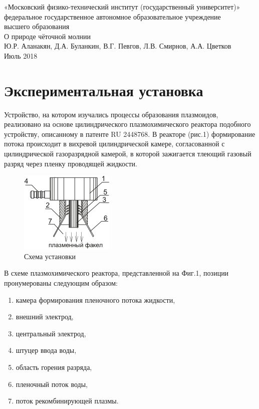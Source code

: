 \documentclass[a4paper]{article}
\begin{document}
\begin{center}
\large{«Московский физико-технический институт (государственный университет)»}\\
\footnotesize{федеральное государственное автономное образовательное учреждение}\\ 
\footnotesize{высшего образования}\\
 \hfill \break
\hfill\break
\hfill \break
\hfill \break
\hfill \break
\large{О природе чёточной молнии}\\
\hfill \break
\hfill \break
\hfill \break
\hfill \break
\large{Ю.Р. Аланакян, Д.А. Буланкин, В.Г. Певгов, Л.В. Смирнов, А.А. Цветков}\\
\hfill \break
\hfill \break
\hfill \break
\hfill \break
\hfill \break
\normalsize{Июль 2018} 
\end{center}

\newpage

\section{Экспериментальная установка}
Устройство, на котором изучались процессы образования плазмоидов, реализовано на основе цилиндрического плазмохимического реактора подобного устройству, описанному в патенте RU 2448768. В реакторе (рис.1) формирование потока происходит в вихревой цилиндрической камере, согласованной с цилиндрической газоразрядной камерой, в которой зажигается тлеющий газовый разряд через пленку проводящей жидкости.
\begin{figure}[h]
    \includegraphics{ShemaUstanovki.png}
    \centering
    \caption{Схема установки}
\end{figure}

В схеме плазмохимического реактора, представленной на Фиг.1, позиции пронумерованы следующим образом:
\begin{enumerate}
    \item камера формирования пленочного потока жидкости,
    \item внешний электрод,
    \item центральный электрод,
    \item штуцер ввода воды,
    \item область горения разряда,
    \item пленочный поток воды,
    \item поток рекомбинирующей плазмы.
\end{enumerate}
\end{document}
